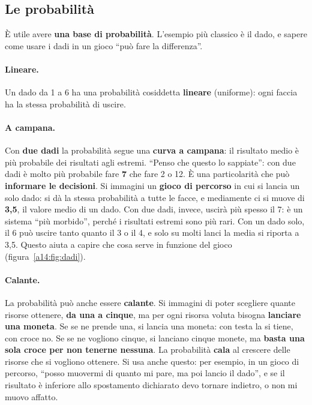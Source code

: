 \subsection{Le probabilità}

È utile avere \textbf{una base di probabilità}. L'esempio più classico è il dado, e sapere come
usare i dadi in un gioco ``può fare la differenza''.

\paragraph{Lineare.} Un dado da 1 a 6 ha una probabilità cosiddetta \textbf{lineare}
(uniforme): ogni faccia ha la stessa probabilità di uscire.

\paragraph{A campana.} Con \textbf{due dadi} la probabilità segue una \textbf{curva a campana}:
il risultato medio è più probabile dei risultati agli estremi. ``Penso che questo lo sappiate'':
con due dadi è molto più probabile fare \textbf{7} che fare 2 o 12. È una particolarità che può
\textbf{informare le decisioni}. Si immagini un \textbf{gioco di percorso} in cui si lancia un
solo dado: si dà la stessa probabilità a tutte le facce, e mediamente ci si muove di
\textbf{3,5}, il valore medio di un dado. Con due dadi, invece, uscirà più spesso il 7: è un
sistema ``più morbido'', perché i risultati estremi sono più rari. Con un dado solo, il 6 può
uscire tanto quanto il 3 o il 4, e solo su molti lanci la media si riporta a 3,5. Questo aiuta
a capire che cosa serve in funzione del gioco (figura~\ref{a14:fig:dadi}).

\paragraph{Calante.} La probabilità può anche essere \textbf{calante}. Si immagini di poter
scegliere quante risorse ottenere, \textbf{da una a cinque}, ma per ogni risorsa voluta bisogna
\textbf{lanciare una moneta}. Se se ne prende una, si lancia una moneta: con testa la si tiene,
con croce no. Se se ne vogliono cinque, si lanciano cinque monete, ma \textbf{basta una sola
croce per non tenerne nessuna}. La probabilità \textbf{cala} al crescere delle risorse che si
vogliono ottenere. Si usa anche questo: per esempio, in un gioco di percorso, ``posso muovermi
di quanto mi pare, ma poi lancio il dado'', e se il risultato è inferiore allo spostamento
dichiarato devo tornare indietro, o non mi muovo affatto.

